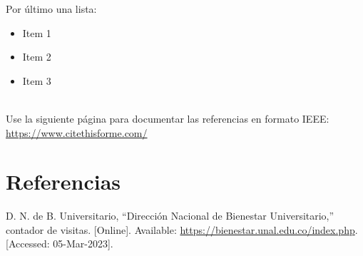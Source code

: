 \documentclass{article}
\begin{document}
Por último una lista:

\begin{itemize}
  \item Item 1
  \item Item 2
  \item Item 3\\\\
\end{itemize}


Use la siguiente página para documentar las referencias en formato IEEE: 
\href{https://www.citethisforme.com/}{https://www.citethisforme.com/}

\section{Referencias}
\renewcommand{\refname}{}
\begin{thebibliography}{9}

 \label{ref:bienUniv}D. N. de B. Universitario, “Dirección Nacional de Bienestar Universitario,” contador de visitas. [Online]. Available: \href{https://bienestar.unal.edu.co/index.php}{https://bienestar.unal.edu.co/index.php}. [Accessed: 05-Mar-2023].  



\end{thebibliography}
\end{document}
